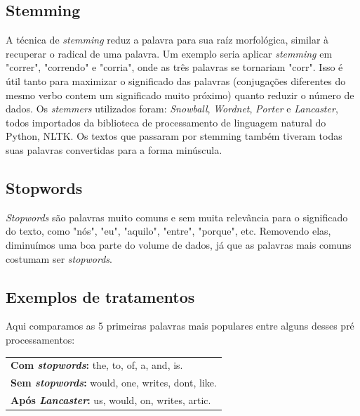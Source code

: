 \documentclass[conference]{IEEEtran}
\begin{document}
\subsection{Stemming}
A  técnica de \textit{stemming} reduz a palavra para sua raíz morfológica, similar à recuperar o radical de uma palavra. Um exemplo seria aplicar \textit{stemming} em "correr", "correndo" e "corria", onde as três palavras se tornariam "corr". Isso é útil tanto para maximizar o significado das palavras (conjugações diferentes do mesmo verbo contem um significado muito próximo) quanto reduzir o número de dados. Os \textit{stemmers} utilizados foram: \textit{Snowball}\cite{b6}, \textit{Wordnet}\cite{b7}, \textit{Porter}\cite{b8} e \textit{Lancaster}\cite{b9}, todos importados da biblioteca de processamento de linguagem natural do Python, NLTK\cite{b14}. Os textos que passaram por stemming também tiveram todas suas palavras convertidas para a forma minúscula.

\subsection{Stopwords}
\textit{Stopwords} são palavras muito comuns e sem muita relevância para o significado do texto, como "nós", "eu", "aquilo", "entre", "porque", etc. Removendo elas, diminuímos uma boa parte do volume de dados, já que as palavras mais comuns costumam ser \textit{stopwords}.

\subsection{Exemplos de tratamentos}
Aqui comparamos as 5 primeiras palavras mais populares entre alguns desses pré processamentos:

\begin{center}

    \begin{tabular}{ l }
    \textbf{Com \textit{stopwords}:} the, to, of, a, and, is.  \\
    \textbf{Sem \textit{stopwords}:} would, one, writes, dont, like.  \\
    \textbf{Após \textit{Lancaster}:} us, would, on, writes, artic. \\ 
    \end{tabular}
\newline

\end{center}
\end{document}
